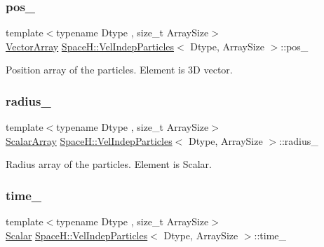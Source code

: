 \subsubsection{\texorpdfstring{pos\+\_\+}{pos\_}}
{\footnotesize\ttfamily template$<$typename Dtype , size\+\_\+t Array\+Size$>$ \\
\mbox{\hyperlink{class_space_h_1_1_vel_indep_particles_aa9983058940249df8b00fa800e8cbad2}{Vector\+Array}} \mbox{\hyperlink{class_space_h_1_1_vel_indep_particles}{Space\+H\+::\+Vel\+Indep\+Particles}}$<$ Dtype, Array\+Size $>$\+::pos\+\_\+\hspace{0.3cm}{\ttfamily [protected]}}



Position array of the particles. Element is 3D vector. 

\mbox{\label{class_space_h_1_1_vel_indep_particles_a114b2db596d038f80ec5f0bb52d9514c}} 
\subsubsection{\texorpdfstring{radius\+\_\+}{radius\_}}
{\footnotesize\ttfamily template$<$typename Dtype , size\+\_\+t Array\+Size$>$ \\
\mbox{\hyperlink{class_space_h_1_1_vel_indep_particles_ab5efeef52fb5748c25fbfeb04b64640e}{Scalar\+Array}} \mbox{\hyperlink{class_space_h_1_1_vel_indep_particles}{Space\+H\+::\+Vel\+Indep\+Particles}}$<$ Dtype, Array\+Size $>$\+::radius\+\_\+\hspace{0.3cm}{\ttfamily [protected]}}



Radius array of the particles. Element is Scalar. 

\mbox{\label{class_space_h_1_1_vel_indep_particles_af3b79520c5a15a82c391434c4f76d647}} 
\subsubsection{\texorpdfstring{time\+\_\+}{time\_}}
{\footnotesize\ttfamily template$<$typename Dtype , size\+\_\+t Array\+Size$>$ \\
\mbox{\hyperlink{class_space_h_1_1_vel_indep_particles_aeb47d8131b30ed790320ff634f0d6af1}{Scalar}} \mbox{\hyperlink{class_space_h_1_1_vel_indep_particles}{Space\+H\+::\+Vel\+Indep\+Particles}}$<$ Dtype, Array\+Size $>$\+::time\+\_\+\hspace{0.3cm}{\ttfamily [protected]}}




